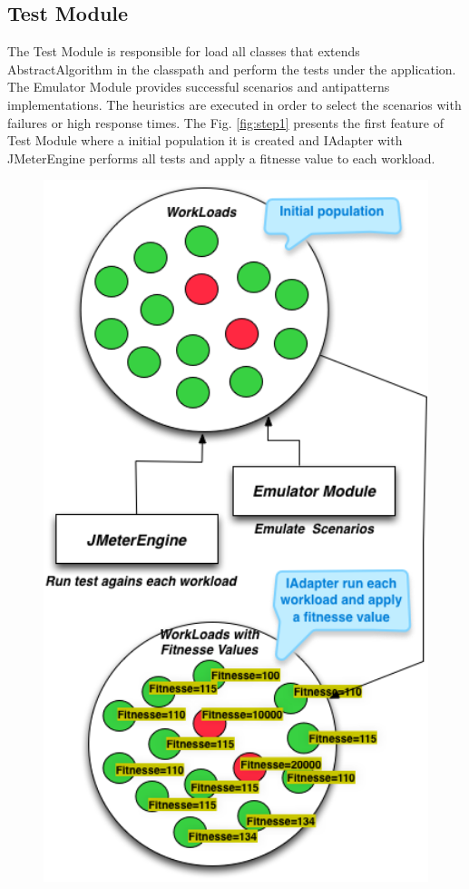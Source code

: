 \documentclass[times]{stvrauth}
\begin{document}
\subsection{Test Module}

The Test Module is responsible for load all classes that extends AbstractAlgorithm in the classpath and perform the tests under the application. The Emulator Module provides successful scenarios and antipatterns implementations. The heuristics are executed in order to select the scenarios with failures or high response times. The Fig. \ref{fig:step1} presents the first feature of Test Module where a initial population it is created and IAdapter with JMeterEngine performs all tests and apply a fitnesse value to each workload.

\begin{figure}[h]
\begin{minipage}{.5\textwidth}
\centering
\includegraphics[width=1\textwidth]{./images/step1.png}

\end{minipage}
\end{figure}
\end{document}
